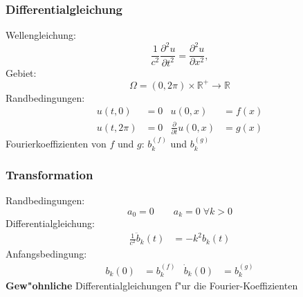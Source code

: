 \documentclass{beamer}
\begin{document}
\begin{frame}
\frametitle{Differentialgleichung}

Wellengleichung:
\[
\frac{1}{c^2}
\frac{\partial^2 u}{\partial t^2}
=
\frac{\partial^2 u}{\partial x^2},
\]
Gebiet:
\[
\Omega = (0,2\pi)\times \mathbb R^+\to \mathbb R
\]
Randbedingungen:
\begin{align*}
u(t,    0)&= 0&u(0,x)&=f(x)\\
u(t, 2\pi)&= 0&\frac{\partial}{\partial t}u(0,x)&=g(x)
\end{align*}
Fourierkoeffizienten von $f$ und $g$: $b_k^{(f)}$ und $b^{(g)}_k$

\end{frame}

\begin{frame}
\frametitle{Transformation}
Randbedingungen:
\[
a_0=0\qquad
a_k=0\;\forall k > 0
\]
Differentialgleichung:
\begin{align*}
\frac{1}{c^2}\ddot b_k(t)&= -k^2b_k(t)
\end{align*}
Anfangsbedingung:
\begin{align*}
b_k(0)&= b_k^{(f)}& \dot b_k(0)&=b_k^{(g)}
\end{align*}
{\bf Gew"ohnliche} Differentialgleichungen f"ur die Fourier-Koeffizienten
\end{frame}
\end{document}
